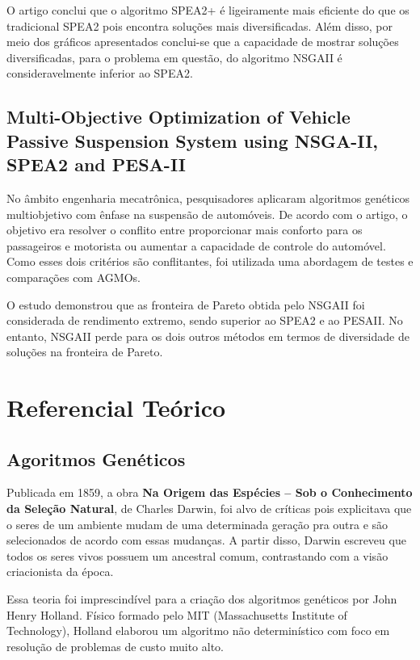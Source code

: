 \documentclass[]{article}
\begin{document}
   	O artigo conclui que o algoritmo SPEA2+ \cite{SPEA2+} é ligeiramente mais eficiente do que os tradicional SPEA2 pois encontra soluções mais diversificadas. Além disso, por meio dos gráficos apresentados conclui-se que a capacidade de mostrar soluções diversificadas, para o problema em questão,
	do algoritmo NSGAII é consideravelmente inferior ao SPEA2.
	
	
    
    \subsection{Multi-Objective Optimization of Vehicle Passive Suspension
    	System using NSGA-II, SPEA2 and PESA-II}
    	
   	No âmbito engenharia mecatrônica, pesquisadores aplicaram algoritmos genéticos multiobjetivo com ênfase na suspensão de automóveis. De acordo com o artigo\cite{SuspensionCar}, o objetivo era resolver o conflito entre proporcionar mais conforto para os passageiros e motorista ou aumentar a capacidade de controle do automóvel. Como esses dois critérios são conflitantes, foi utilizada uma abordagem de testes e comparações com AGMOs.
   	
   	O estudo demonstrou que as fronteira de Pareto obtida pelo NSGAII foi considerada de rendimento extremo, sendo superior ao SPEA2 e ao PESAII\cite{PESA-II}. No entanto, NSGAII perde para os dois outros métodos em termos de diversidade de soluções na fronteira de Pareto.
   	
    
	

\section{Referencial Teórico}
\subsection{Agoritmos Genéticos}

	Publicada em 1859, a obra \textbf{Na Origem das Espécies – Sob o Conhecimento da Seleção Natural}, de Charles Darwin, foi alvo de críticas pois explicitava que o seres de um ambiente mudam de uma determinada geração pra outra e são selecionados de acordo com essas mudanças. A partir disso, Darwin escreveu que todos os seres vivos possuem um ancestral comum, contrastando com a visão criacionista da época.
	
	Essa teoria foi imprescindível para a criação dos algoritmos genéticos por John Henry Holland. Físico formado pelo MIT (Massachusetts Institute of Technology), Holland elaborou um algoritmo não determinístico com foco em resolução de problemas de custo muito alto.
	
\end{document}
